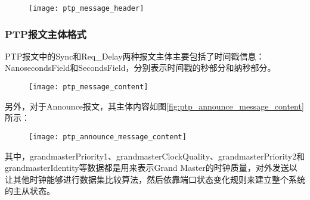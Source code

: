 \begin{figure}[!hbp]
  \centering
  \begin{minipage}[b]{0.6\textwidth}
    \captionstyle{\centering}
    \centering
    \texttt{[image: ptp\_message\_header]}
  \end{minipage}     
\end{figure}

\subsubsection{PTP报文主体格式}
PTP报文中的Sync和Req\_Delay两种报文主体主要包括了时间戳信息：NanosecondsField和SecondsField，分别表示时间戳的秒部分和纳秒部分。
\begin{figure}[!hbp]
  \centering
  \begin{minipage}[b]{0.6\textwidth}
    \captionstyle{\centering}
    \centering
    \texttt{[image: ptp\_message\_content]}
  \end{minipage}     
\end{figure}

另外，对于Announce报文，其主体内容如图\ref{fig:ptp_announce_message_content}所示：

\begin{figure}[!hbp]
  \centering
  \begin{minipage}[b]{0.6\textwidth}
    \captionstyle{\centering}
    \centering
    \texttt{[image: ptp\_announce\_message\_content]}
  \end{minipage}     
\end{figure}

其中，grandmasterPriority1、grandmasterClockQuality、grandmasterPriority2和grandmasterIdentity等数据都是用来表示Grand Master的时钟质量，对外发送以让其他时钟能够进行数据集比较算法，然后依靠端口状态变化规则来建立整个系统的主从状态。

